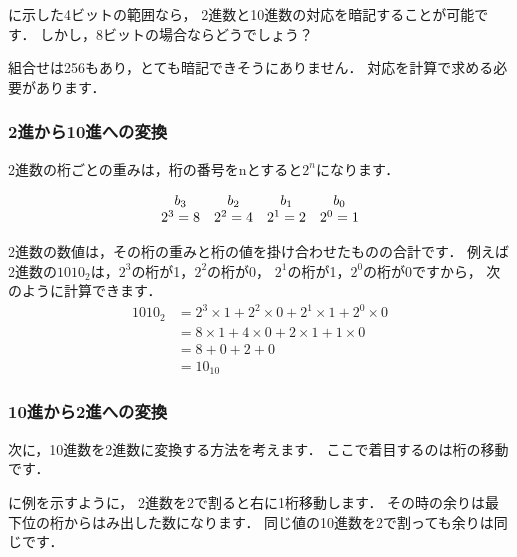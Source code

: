 に示した4ビットの範囲なら，
2進数と10進数の対応を暗記することが可能です．
しかし，8ビットの場合ならどうでしょう？

組合せは256もあり，とても暗記できそうにありません．
対応を計算で求める必要があります．

\subsubsection{2進から10進への変換}

2進数の桁ごとの重みは，桁の番号をnとすると$2^n$になります．

{\small\[
\begin{array}{c c c c c }
b_3     & b_2     & b_1     & b_0     \\
2^3 = 8 & 2^2 = 4 & 2^1 = 2 & 2^0 = 1 \\
\end{array}
\]}

2進数の数値は，その桁の重みと桁の値を掛け合わせたものの合計です．
例えば2進数の$1010_2$は，$2^3$の桁が1，$2^2$の桁が0，
$2^1$の桁が1，$2^0$の桁が0ですから，
次のように計算できます．
{\small\begin{align*}
1010_2 &= 2^3 \times 1 + 2^2 \times 0 + 2^1 \times 1 + 2^0 \times 0 \\
       &= 8 \times 1 + 4 \times 0 + 2 \times 1 + 1 \times 0 \\
       &= 8 + 0 + 2 + 0 \\
       &= 10_{10}
\end{align*}}

\subsubsection{10進から2進への変換}

次に，10進数を2進数に変換する方法を考えます．
ここで着目するのは桁の移動です．

に例を示すように，
2進数を2で割ると右に1桁移動します．
その時の余りは最下位の桁からはみ出した数になります．
同じ値の10進数を2で割っても余りは同じです．

